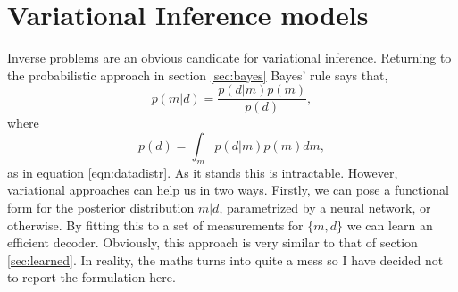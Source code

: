 \documentclass[12pt]{article}
\begin{document}
\section{Variational Inference models}\label{sec:varinf}
Inverse problems are an obvious candidate for variational inference. Returning to the probabilistic approach in section \ref{sec:bayes} Bayes' rule says that,
\begin{equation}
p(m | d)=\frac{p(d | m) p(m)}{p(d)},\label{eqn:Bayes_pmd}
\end{equation}   
where 
\begin{equation}
p(d)=\int_m p(d|m)p(m) dm,
\end{equation}
as in equation \ref{eqn:datadistr}. As it stands this is intractable. However, variational approaches can help us in two ways. Firstly, we can pose a functional form for the posterior distribution $m|d$, parametrized by a neural network, or otherwise. By fitting this to a set of measurements for $\{m,d\}$ we can learn an efficient decoder. Obviously, this approach is very similar to that of section \ref{sec:learned}. In reality, the maths turns into quite a mess so I have decided not to report the formulation here. 
  
\end{document}
